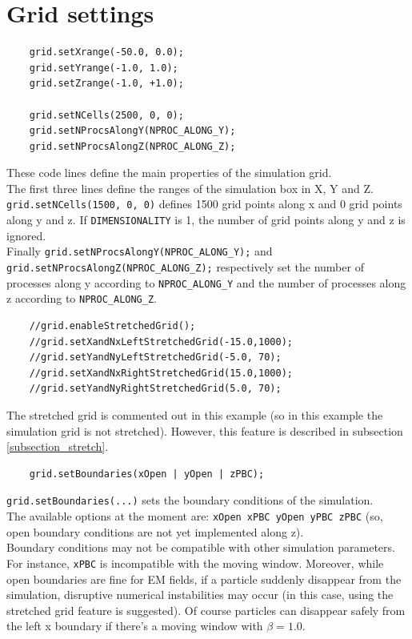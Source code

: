 \documentclass[11pt,a4paper]{report}
\begin{document}
\section{Grid settings}
\begin{lstlisting}
	grid.setXrange(-50.0, 0.0);
	grid.setYrange(-1.0, 1.0);
	grid.setZrange(-1.0, +1.0);

	grid.setNCells(2500, 0, 0);
	grid.setNProcsAlongY(NPROC_ALONG_Y);
	grid.setNProcsAlongZ(NPROC_ALONG_Z);
\end{lstlisting}
These code lines define the main properties of the simulation grid.\\
The first three lines define the ranges of the simulation box in X, Y and Z.\\
\verb+grid.setNCells(1500, 0, 0)+ defines 1500 grid points along x and 0 grid points along y and z. If \verb+DIMENSIONALITY+ is 1, the number of grid points along y and z is ignored.\\
Finally \verb+grid.setNProcsAlongY(NPROC_ALONG_Y);+ and \verb+grid.setNProcsAlongZ(NPROC_ALONG_Z);+ respectively set the number of processes along y according to \verb+NPROC_ALONG_Y+ and the number of processes along z according to \verb+NPROC_ALONG_Z+.
\begin{lstlisting}
	//grid.enableStretchedGrid();
	//grid.setXandNxLeftStretchedGrid(-15.0,1000);
	//grid.setYandNyLeftStretchedGrid(-5.0, 70);
	//grid.setXandNxRightStretchedGrid(15.0,1000);
	//grid.setYandNyRightStretchedGrid(5.0, 70);
\end{lstlisting}
The stretched grid is commented out in this example (so in this example the simulation grid is not stretched). However, this feature is described in subsection \ref{subsection_stretch}.
\begin{lstlisting}
	grid.setBoundaries(xOpen | yOpen | zPBC);
\end{lstlisting}
\verb+grid.setBoundaries(...)+ sets the boundary conditions of the simulation.\\ The available options at the moment are: \verb+xOpen xPBC yOpen yPBC zPBC+ 
(so, open boundary conditions are not yet implemented along z).\\
Boundary conditions may not be compatible with other simulation parameters. For instance, \verb+xPBC+ is incompatible with the moving window. Moreover, while open boundaries are fine for EM fields, if a particle suddenly disappear from the simulation, disruptive numerical instabilities may occur (in this case, using the stretched grid feature is suggested). Of course particles can disappear safely from the left x boundary if there's a moving window with $\beta = 1.0$. 
\end{document}
